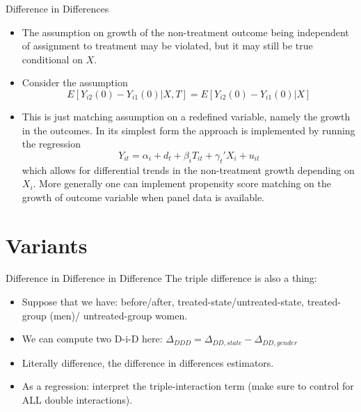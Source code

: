 \documentclass[xcolor=pdftex,dvipsnames,table,mathserif,aspectratio=169]{beamer}
\begin{document}
\begin{frame}{Difference in Differences}
\begin{itemize}
\item The assumption on growth of the non-treatment outcome being independent of assignment to treatment may be violated, but it may still be true conditional on $X$.
\item Consider the assumption
$$ E[Y_{i2}(0)- Y_{i1}(0) | X,T] = E[Y_{i2}(0)- Y_{i1}(0) | X] $$ 
\item This is just matching assumption on a redefined variable, namely the growth in the outcomes. In its simplest form the approach is implemented by running the regression
$$ Y_{it} = \alpha_i + d_t + \beta_i T_{it} + \gamma_t' X_i + u_{it}$$ 
which allows for differential trends in the non-treatment growth depending on $X_i$. More generally one can implement propensity score matching on the growth of outcome variable when panel data is available.
\end{itemize}
\end{frame}

\section{Variants}

\begin{frame}{Difference in Difference in Difference}
The triple difference is also a thing:
\begin{itemize}
\item Suppose that we have: before/after, treated-state/untreated-state, treated-group (men)/ untreated-group women.
\item We can compute two D-i-D here: $\Delta_{DDD} = \Delta_{DD,state} - \Delta_{DD,gender}$ 
\item Literally difference, the difference in differences estimators.
\item As a regression: interpret the triple-interaction term (make sure to control for ALL double interactions).
\end{itemize}

\end{frame}
\end{document}
